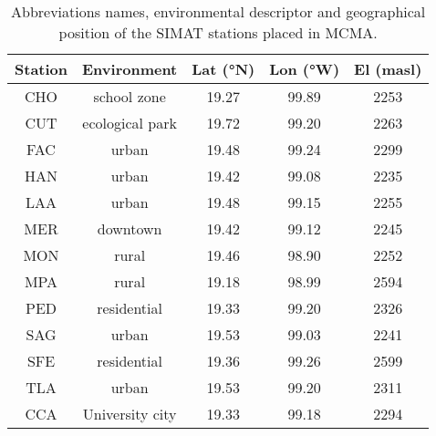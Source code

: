 \begin{table}[H]
\centering
\begin{tabular}{ccccc}
\hline
Station&Environment &Lat (°N)	&Lon (°W)&	El (masl)		\\ \hline
CHO &school zone&	19.27&	99.89&	2253\\ 
CUT &ecological park&	19.72&	99.20	&2263\\
FAC &urban&	19.48&	99.24	&2299\\
HAN &urban&	19.42&	99.08	&2235\\		
LAA &urban&	19.48&	99.15&	2255\\		
MER	&downtown&19.42	&99.12	&2245\\
MON	&rural&19.46&	98.90	&2252\\
MPA	&rural&19.18	&98.99	&2594\\	
PED	&residential &19.33	&99.20	&2326\\		
SAG	&urban&19.53	&99.03	&2241\\		
SFE	&residential &19.36	&99.26	&2599\\		
TLA&urban &	19.53	&99.20	&2311\\ 
CCA &University city&  19.33 & 99.18 & 2294\\\hline
\end{tabular}
\caption{Abbreviations names, environmental descriptor and geographical position of the SIMAT stations placed in MCMA.}
\end{table}